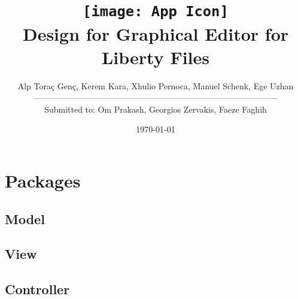\documentclass[10pt,a4paper]{report}
\title{\texttt{[image: App Icon]}\\Design for Graphical Editor for Liberty Files}
\author{Alp Toraç Genç, Kerem Kara, Xhulio Pernoca, Manuel Schenk, Ege Uzhan \leavevmode \\---------------------------------------------------------------------------------------\\
Submitted to: Om Prakash, Georgios Zervakis, Faeze Faghih}
\date{\today}
\begin{document}
\maketitle
\label{sec:title}
\tableofcontents

\chapter{Packages}
    \section{Model}
    \section{View}
    \section{Controller}
\end{document}
